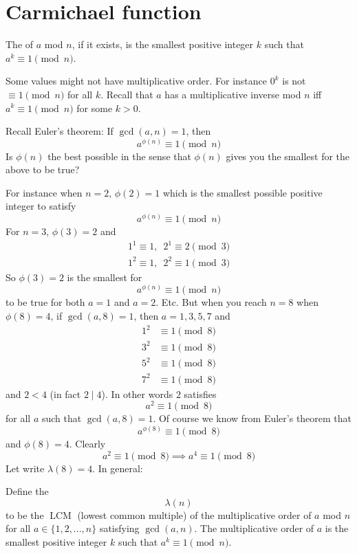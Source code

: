 \section{Carmichael function}

\begin{defn}
  The  of $a$ mod $n$, if it exists,
  is the smallest positive integer $k$
  such that $a^k \equiv 1 \pmod{n}$.
\end{defn}

Some values might not have multiplicative order.
For instance $0^k$ is not $\equiv 1 \pmod{n}$ for all $k$.
Recall that 
$a$ has a multiplicative inverse mod $n$
iff $a^k \equiv 1 \pmod{n}$ for some $k > 0$.

Recall Euler's theorem: If $\gcd(a, n) = 1$, then
\[
a^{\phi(n)} \equiv 1 \pmod{n}
\]
Is $\phi(n)$ the best possible in the sense that $\phi(n)$ gives you
the smallest for the above to be true?

For instance when $n = 2$, $\phi(2) = 1$ which is the smallest
possible positive integer to satisfy
\[
a^{\phi(n)} \equiv 1 \pmod{n}
\]
For $n = 3$, $\phi(3) = 2$ and
\begin{align*}
  1^1 \equiv 1, \,\,\, 2^1 \equiv 2 \pmod{3} \\
  1^2 \equiv 1, \,\,\, 2^2 \equiv 1 \pmod{3}
\end{align*}
So $\phi(3) = 2$ is the smallest for
\[
a^{\phi(n)} \equiv 1 \pmod{n}
\]
to be true for both $a = 1$ and $a = 2$.
Etc.
But when you reach $n = 8$ when $\phi(8) = 4$,
if $\gcd(a, 8) = 1$, then $a = 1, 3, 5, 7$ and
\begin{align*}
  1^2 &\equiv 1 \pmod{8} \\
  3^2 &\equiv 1 \pmod{8} \\
  5^2 &\equiv 1 \pmod{8} \\
  7^2 &\equiv 1 \pmod{8}
\end{align*}
and $2 < 4$ (in fact $2 \mid 4$).
In other words $2$ satisfies
\[
a^2 \equiv 1 \pmod{8}
\]
for all $a$ such that $\gcd(a, 8) = 1$.
Of course we know from Euler's theorem that
\[
a^{\phi{(8)}} \equiv 1 \pmod{8}
\]
and $\phi(8) = 4$.
Clearly 
\[
a^2 \equiv 1 \pmod{8}
\implies
a^4 \equiv 1 \pmod{8}
\]
Let write $\lambda(8) = 4$.
In general:

\begin{defn}
  Define the
  \[
  \lambda(n)
  \]
  to be the $\operatorname{LCM}$ (lowest common multiple)
  of the multiplicative order of $a$ mod $n$
  for all $a \in \{1, 2, ..., n\}$
  satisfying $\gcd(a, n)$.
  The multiplicative order of $a$ is the smallest positive integer $k$
  such that $a^k \equiv 1 \pmod{n}$.
\end{defn}

